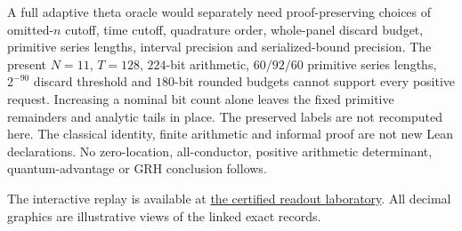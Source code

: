 \documentclass[11pt,oneside,openany]{book}
\theoremstyle{definition}\newtheorem{definition}[theorem]{Definition}
\theoremstyle{remark}\newtheorem{remark}[theorem]{Remark}
\begin{document}
A full adaptive theta oracle would separately need proof-preserving choices
of omitted-$n$ cutoff, time cutoff, quadrature order, whole-panel discard
budget, primitive series lengths, interval precision and serialized-bound
precision. The present $N=11$, $T=128$, $224$-bit arithmetic,
$60/92/60$ primitive series lengths, $2^{-90}$ discard threshold and
$180$-bit rounded budgets cannot support every positive request.
Increasing a nominal bit count alone leaves the fixed primitive remainders
and analytic tails in place. The preserved labels are not recomputed here.
The classical identity, finite arithmetic and informal proof are not new
Lean declarations. No zero-location, all-conductor, positive arithmetic
determinant, quantum-advantage or GRH conclusion follows.

The interactive replay is available at \href{https://amelie-iska.github.io/GRH-research/readout.html}{the certified readout laboratory}. All decimal graphics are illustrative views of the linked exact records.

\end{document}
